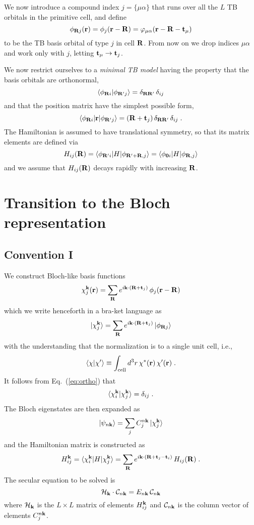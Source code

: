 \documentclass[11pt]{article}
\numberwithin{equation}{section} %
\def\beq{\begin{equation}}
\def\eeq{\end{equation}}
\newcommand{\equ}[1]{Eq.~(\ref{eq:#1})}
\def\ket#1{\vert #1 \rangle}
\def\bra#1{\langle #1 \vert}
\def\me#1#2#3{\bra{#1}#2\ket{#3}}
\def\ip#1#2{\langle #1 \vert #2 \rangle}
\def\k{{\bf k}}
\def\r{{\bf r}}
\def\R{{\bf R}}
\def\t{{\bf t}}
\def\0{{\bf 0}}
\def\t{{\bf t}}
\begin{document}
We now introduce a compound index $j=\{\mu\alpha\}$ that runs over
all the $L$ TB orbitals in the primitive cell, and define
%
\beq
\phi_{\R j}(\r)=\phi_j(\r-\R)=\varphi_{\mu\alpha}(\r-\R-\t_\mu)
\eeq
%
to be the TB basis orbital of type $j$ in cell $\R$.
From now on we drop indices ${\mu\alpha}$ and work only with $j$,
letting $\t_\mu\rightarrow \t_j$.

We now restrict ourselves to a \textit{minimal TB model} having the
property that the basis orbitals are orthonormal,
%
\beq
\ip{\phi_{\R i}}{\phi_{\R' j}}=\delta_{\R\R'}\,\delta_{ij}
\label{eq:ortho}
\eeq
%
and that the position matrix have the simplest possible form,
%
\beq
\me{\phi_{\R i}}{\r}{\phi_{\R' j}}=(\R+\t_j)\,\delta_{\R\R'}\,\delta_{ij} \;.
\label{eq:posit}
\eeq
%
The Hamiltonian is assumed to have translational symmetry, so that its
matrix elements are defined via
%
\beq
H_{ij}(\R)=\me{\phi_{\R'i}}{H}{\phi_{\R'+\R,j}} 
          =\me{\phi_{\0 i}}{H}{\phi_{\R,j}}
\label{eq:ham}
\eeq
%
and we assume that $H_{ij}(\R)$ decays rapidly with increasing $\R$.

\section{Transition to the Bloch representation}

\subsection{Convention I}

We construct Bloch-like basis functions
%
\beq
\chi^\k_j(\r)=\sum_\R e^{i\k\cdot(\R+\t_j)}\,\phi_j(\r-\R)
\eeq
%
which we write henceforth in a bra-ket language as
%
\beq
\ket{\chi^\k_j}=\sum_\R e^{i\k\cdot(\R+\t_j)}\,\ket{\phi_{\R j}}
\eeq
%
with the understanding that the normalization is to a single
unit cell, i.e.,
%
\beq
\ip{\chi}{\chi'} \equiv \int_\textrm{cell} d^3r\,\chi^*(\r) \,\chi'(\r)\;.
\eeq
%
It follows from \equ{ortho} that
%
\beq
\ip{\chi^\k_i}{\chi^{\k}_j}=\delta_{ij} \;.
\eeq
%
The Bloch eigenstates are then expanded as
%
\beq
\ket{\psi_{n\k}} = \sum_j C_j^{n\k} \, \ket{\chi^\k_j}
\eeq
%
and the Hamiltonian matrix is constructed as
%
\beq
H_{ij}^\k = \me{\chi_i^\k}{H}{\chi_j^\k}
=\sum_\R e^{i\k\cdot(\R+\t_j-\t_i)}\,H_{ij}(\R) \;.
\label{eq:Hk}
\eeq
%
The secular equation to be solved is
%
\beq
{\cal H}_\k\cdot {\cal C}_{n\k} = E_{n\k}\,{\cal C}_{n\k}
\eeq
%
where ${\cal H}_\k$ is the $L\times L$ matrix of elements
$H_{ij}^\k$ and ${\cal C}_{n\k}$ is the column vector of
elements $C_j^{n\k}$.
\end{document}
